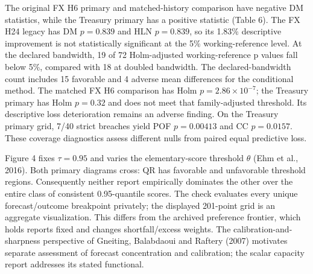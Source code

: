\documentclass[10pt,a4paper]{article}
\begin{document}
The original FX H6 primary and matched-history comparison have negative DM statistics, while the Treasury primary has a positive statistic (Table 6). The FX H24 legacy has DM \(p=0.839\) and HLN \(p=0.839\), so its 1.83\% descriptive improvement is not statistically significant at the 5\% working-reference level. At the declared bandwidth, 19 of 72 Holm-adjusted working-reference p values fall below 5\%, compared with 18 at doubled bandwidth. The declared-bandwidth count includes 15 favorable and 4 adverse mean differences for the conditional method. The matched FX H6 comparison has Holm \(p=2.86\times10^{-7}\); the Treasury primary has Holm \(p=0.32\) and does not meet that family-adjusted threshold. Its descriptive loss deterioration remains an adverse finding. On the Treasury primary grid, 7/40 strict breaches yield POF \(p=0.00413\) and CC \(p=0.0157\). These coverage diagnostics assess different nulls from paired equal predictive loss.

Figure 4 fixes \(\tau=0.95\) and varies the elementary-score threshold \(\theta\) (Ehm et al., 2016). Both primary diagrams cross: QR has favorable and unfavorable threshold regions. Consequently neither report empirically dominates the other over the entire class of consistent 0.95-quantile scores. The check evaluates every unique forecast/outcome breakpoint privately; the displayed 201-point grid is an aggregate visualization. This differs from the archived preference frontier, which holds reports fixed and changes shortfall/excess weights. The calibration-and-sharpness perspective of Gneiting, Balabdaoui and Raftery (2007) motivates separate assessment of forecast concentration and calibration; the scalar capacity report addresses its stated functional.
\end{document}
